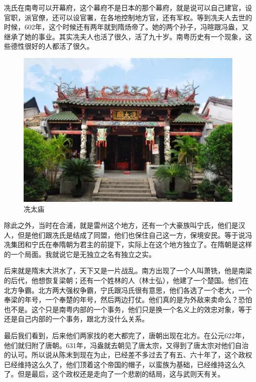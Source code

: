 冼氏在南粤可以开幕府，这个幕府不是日本的那个幕府，就是说可以自己建官，设官职，派官僚，还可以设官署，在各地控制地方官，还有军权。等到冼夫人去世的时候，602年，这个时候还有两年就到隋炀帝了。她的两个孙子，冯暄跟冯盎，又继承了她的事业。其实冼夫人也活了很久，活了九十岁。南粤历史有一个现象，这些德性很好的人都活了很久。

\begin{figure}
	\centering
	\includegraphics[width=\textwidth]{images/image-23}
	\caption{冼太庙}
\end{figure}

除此之外，当时在合浦，就是雷州这个地方，还有一个大豪族叫宁氏，他们是汉人，但是他们跟冼氏是结成了同盟，他们也保住自己这一方，保境安民。等于说冯冼集团和宁氏在奉隋朝为君主的前提下，实际上在这个地方独立了。在隋朝是这样的一个局面。我就说它是无独立之名有独立之实。

后来就是隋末大洪水了，天下又是一片战乱。南方出现了一个人叫萧铣，他是南梁的后代，他想恢复梁朝；还有一个姓林的人（林士弘），他建了一个楚国。他们在北方争霸。北方两大强权争霸，宁氏跟冯氏很有意思，他们各选了一个老大，一个奉梁的年号，一个奉楚的年号，然后两边打仗。他们真的是为外敌来卖命么？恐怕也不是。这个只是南粤内部的一个事务，他们只是换一个名义上的效忠对象，等于还是自己内部的一个事务，跟北方没什么关系。

最后我们看到，后来他们两家找的老大都完了，唐朝出现在北方。在公元622年，他们就归附了唐朝。631年，冯盎就去朝见了唐太宗，又得到了唐太宗对他们自治的认可。所以说从陈末到现在为止，已经差不多过去了有五、六十年了，这个政权已经维持这么久了，他们顶着这个帝国的帽子，以蛮族为基础，已经维持这么久了。但是最后，这个政权还是走向了一个悲剧的结局，这与武则天有关。

